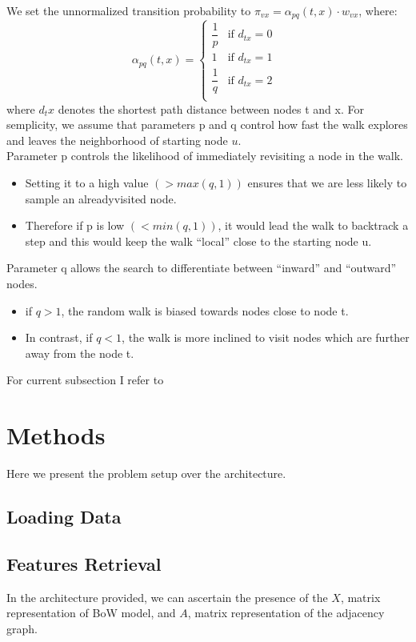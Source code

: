 \documentclass{report}
\begin{document}
 We set the unnormalized
transition probability to $\pi_{vx} = \alpha_{pq}(t, x) · w_{vx}$, where:
\[
\alpha_{pq}(t, x) =  
\begin{cases}
\dfrac{1}{p} & \text{if $d_{tx} = 0$ }\\
1 & \text{if $d_{tx} = 1$ }\\
\dfrac{1}{q} & \text{if $d_{tx} = 2$ }\\
\end{cases}
\]
where $d_tx$ denotes the shortest path distance between nodes t and x.
For semplicity, we assume that parameters p and q control how fast the walk explores and leaves the neighborhood of starting node $u$.
\\Parameter p controls the likelihood of immediately
revisiting a node in the walk. 
\begin{itemize}


\item Setting it to a high value
$(> max(q, 1))$ ensures that we are less likely to sample an alreadyvisited
node. 
\item Therefore if p is low $(< min(q, 1))$, it would lead the walk to
backtrack a step and this would keep the walk “local”
close to the starting node u.
\end{itemize}

Parameter q allows the search to differentiate between “inward” and “outward” nodes.
\begin{itemize}

\item  if $q > 1$, the random walk is biased towards nodes close to node t.
\item  In contrast, if $q < 1$, the walk is more inclined to visit nodes
which are further away from the node t.
\end{itemize}
For current subsection I refer to \cite{n2v}

\section{Methods}
Here we present the problem setup over the \cite{Kipf_GCN} architecture.

\subsection{Loading Data}
\subsection{Features Retrieval}
In the architecture provided, we can ascertain the presence of the $X$, matrix representation of BoW model, and $A$, matrix representation of the adjacency graph. 
\end{document}
